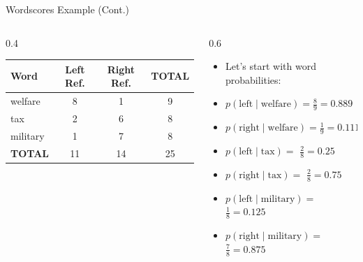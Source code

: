 \documentclass[
  ignorenonframetext,
  aspectratio=169]{beamer}
\begin{document}
\begin{frame}{Wordscores Example (Cont.)}
\label{wordscores-example-cont.}
\begin{columns}[T]
    \begin{column}{0.4\textwidth}
    \centering
    \footnotesize
    \begin{tabular}{lccc}
    \toprule
    Word & Left Ref. & Right Ref. & TOTAL \\
    \midrule
    welfare & 8 & 1 & 9 \\
    tax & 2 & 6 & 8 \\
    military & 1 & 7 & 8 \\
    \midrule
    \textbf{TOTAL} & 11 & 14 & 25 \\
    \bottomrule
    \end{tabular}
    \end{column}
    \begin{column}{0.6\textwidth}
    \normalsize
    \begin{itemize}
        \item Let's start with word probabilities: 
        \item[] $p(\text{left}\mid \text{welfare}) = \frac{8}{9} = 0.889$ 
        \item[] $p(\text{right}\mid \text{welfare}) = \frac{1}{9} = 0.111$ \pause 
        \item[] $p(\text{left}\mid \text{tax}) =$ \pause $\frac{2}{8} = 0.25$ 
        \item[] $p(\text{right}\mid \text{tax}) =$ \pause $\frac{2}{8} = 0.75$
        \item[] $p(\text{left}\mid \text{military}) =$ \pause $\frac{1}{8} = 0.125$
        \item[] $p(\text{right}\mid \text{military}) =$ \pause $\frac{7}{8} = 0.875 $
    \end{itemize}
    \end{column}
\end{columns}
\end{frame}
\end{document}
